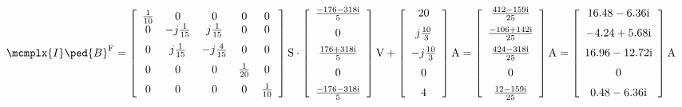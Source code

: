 \begin{exemple}
    {\fontsize{10pt}{10pt}\selectfont
    \[
    \mcmplx{I}\ped{B}^{\text{F}} =
     \begin{bmatrix}\begin{array}{ccccc}
        \frac{1}{10} & 0 & 0 & 0 & 0 \\
        0 & -j\frac{1}{15} & j\frac{1}{15} & 0 & 0 \\[2mm]
        0 & j\frac{1}{15} & -j\frac{4}{15} & 0 & 0 \\[2mm]
        0 & 0 & 0 & \frac{1}{20} & 0 \\[2mm]
        0 & 0 & 0 & 0 & \frac{1}{10}
     \end{array}\end{bmatrix}\unit{S} \cdot
     \begin{bmatrix}\begin{array}{c}
        \frac{\complexnum{-176 - j 318}}{5} \\[2mm]
        0  \\[2mm]
        \frac{\complexnum{176 + j 318}}{5} \\[2mm]
        0  \\[2mm]
        \frac{\complexnum{ -176 - j 318}}{5}
	\end{array}\end{bmatrix}\unit{V}  +
     \begin{bmatrix}\begin{array}{c}
        20 \\[2mm]
         j \frac{10}{3} \\[2mm]
         -j \frac{10}{3} \\[2mm]
         0 \\[2mm]
        4
     \end{array}\end{bmatrix}\unit{A} =
     \begin{bmatrix}\begin{array}{c}
        \frac{\complexnum{ 412 - j 159}}{25} \\[2mm]
        \frac{\complexnum{-106 + j 142}}{25}  \\[2mm]
        \frac{\complexnum{424 - j 318}}{25} \\[2mm]
        0  \\[2mm]
        \frac{\complexnum{12 - j 159}}{25}
	\end{array}\end{bmatrix}\unit{A} =
	\begin{bmatrix}\begin{array}{c}
		\complexnum{ 16,48 - j 6,36} \\[2mm]
		\complexnum{-4,24 + j 5,68}  \\[2mm]
		\complexnum{16,96 - j 12,72} \\[2mm]
			0  \\[2mm]
		\complexnum{0,48 - j 6,36}
	\end{array}\end{bmatrix}\unit{A}
	\] }


\end{exemple}
